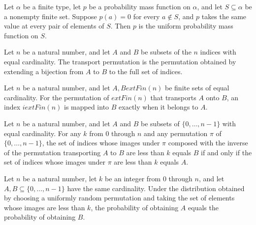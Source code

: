\begin{theorem}
\label{FABL.pmf_eq_uniformOfFinset_of_constant_on}
\leanok
{}
Let $\alpha$ be a finite type, let $p$ be a probability mass function on $\alpha$, and
let $S\subseteq\alpha$ be a nonempty finite set. Suppose $p(a)=0$ for every $a\notin S$,
and $p$ takes the same value at every pair of elements of $S$. Then $p$ is the uniform
probability mass function on $S$.
\end{theorem}

\begin{definition}
\label{FABL.finsetTransportPerm}
\leanok
Let $n$ be a natural number, and let $A$ and $B$ be subsets of the $n$ indices with
equal cardinality. The transport permutation is the permutation obtained by extending a
bijection from $A$ to $B$ to the full set of indices.
\end{definition}

\begin{theorem}
\label{FABL.mem_finsetTransportPerm_iff}
\leanok
{}
Let $n$ be a natural number, and let $A,B	ext{Fin}(n)$ be finite sets of equal
cardinality. For the permutation of $	ext{Fin}(n)$ that transports $A$ onto $B$, an
index $i	ext{Fin}(n)$ is mapped into $B$ exactly when it belongs to $A$.
\end{theorem}

\begin{theorem}
\label{FABL.maximalPathPrefix_mul_transport_eq_iff}
\leanok
{}
Let $n$ be a natural number, and let $A$ and $B$ be subsets of $\{0,\ldots,n-1\}$ with
equal cardinality. For any $k$ from $0$ through $n$ and any permutation $\pi$ of
$\{0,\ldots,n-1\}$, the set of indices whose images under $\pi$ composed with the
inverse of the permutation transporting $A$ to $B$ are less than $k$ equals $B$ if and
only if the set of indices whose images under $\pi$ are less than $k$ equals $A$.
\end{theorem}

\begin{theorem}
\label{FABL.maximalPathLayerPMF_eq_of_card_eq}
\leanok
{}
Let $n$ be a natural number, let $k$ be an integer from $0$ through $n$, and let
$A,B\subseteq\{0,\ldots,n-1\}$ have the same cardinality. Under the distribution
obtained by choosing a uniformly random permutation and taking the set of elements whose
images are less than $k$, the probability of obtaining $A$ equals the probability of
obtaining $B$.
\end{theorem}

